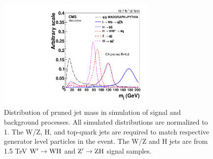 \begin{figure}[ht!b]
\begin{center}
\includegraphics[width=0.69\textwidth]{EventSelectionFigures/signal-data-qcd-jetmass.pdf}
\end{center}
\caption{Distribution of pruned jet mass in
  simulation of signal and background processes.
  All simulated distributions are normalized to 1.
  The W/Z, H, and top-quark jets are required to
  match respective generator level particles in the event.
  The W/Z and H jets are from 1.5 TeV $\rm{W' \to WH}$ and 
  $\rm{Z' \to ZH}$ signal samples.
}  
\label{fig:JetMassTagging}
\end{figure}

